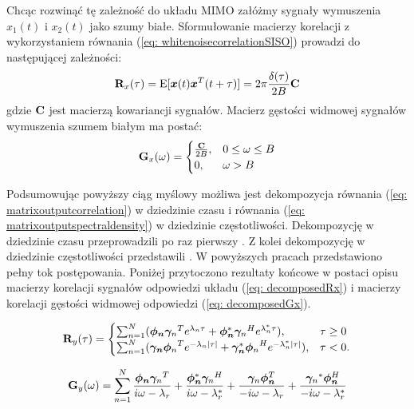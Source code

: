 Chcąc rozwinąć tę zależność do układu MIMO załóżmy sygnały wymuszenia $x_1(t)$ i $x_2(t)$ jako szumy białe. Sformułowanie macierzy korelacji z wykorzystaniem równania (\ref{eq: whitenoisecorrelationSISO}) prowadzi do następującej zależności:
\begin{equation} \label{eq: whitenoisecorrelationMIMO}
	\mathbf{R}_x(\tau)=\mathrm{E}[\bm{x}(t)\bm{x}^T(t+\tau)]=2\pi \frac{\delta(\tau)}{2B}\mathbf{C}
\end{equation} 
gdzie $\mathbf{C}$ jest macierzą kowariancji sygnałów. Macierz gęstości widmowej sygnałów wymuszenia szumem białym ma postać:
\begin{equation} \label{eq: spectraldensitymatrixWHITENOISE}
	\mathbf{G}_x(\omega)=\begin{cases}
		\frac{\mathbf{C}}{2B}, & 0\le\omega\le B\\
		0, & \omega>B
	\end{cases}
\end{equation} 


Podsumowując powyższy ciąg myślowy możliwa jest dekompozycja równania (\ref{eq: matrixoutputcorrelation}) w dziedzinie czasu i równania (\ref{eq: matrixoutputspectraldensity}) w dziedzinie częstotliwości. Dekompozycję w dziedzinie czasu przeprowadzili po raz pierwszy \cite{James1993,James1995}. Z kolei dekompozycję w dziedzinie częstotliwości przedstawili \cite{Brincker2000,Brincker2001a}. W powyższych pracach przedstawiono pełny tok postępowania. Poniżej przytoczono rezultaty końcowe w postaci opisu macierzy korelacji sygnałów odpowiedzi układu (\ref{eq: decomposedRx}) i macierzy korelacji gęstości widmowej odpowiedzi (\ref{eq: decomposedGx}).

\begin{equation} \label{eq: decomposedRx}
	\mathbf{R}_y(\tau)=\begin{cases}
		\sum_{n=1}^{N} (\bm{\phi_n}{\bm{\gamma}_n}^Te^{\lambda_n \tau} + \bm{\phi_n}^*{\bm{\gamma}_n}^He^{\lambda_n^* \tau}), & \tau\ge 0\\
		\sum_{n=1}^{N} (\bm{\gamma_n}{\bm{\phi}_n}^Te^{-\lambda_n |\tau|} + \bm{\gamma_n}^*{\bm{\phi}_n}^He^{-\lambda_n^* |\tau|}), & \tau< 0.
	\end{cases}
\end{equation} 

\begin{equation} \label{eq: decomposedGx}
	\mathbf{G}_y(\omega)=\sum_{n=1}^{N}\frac{\bm{\phi_n}{\bm{\gamma}_n}^T}{i\omega-\lambda_r}+\frac{\bm{\phi_n}^*{\bm{\gamma}_n}^H}{i\omega-\lambda_r^*}+\frac{{\bm{\gamma}_n}\bm{\phi_n}^T}{-i\omega-\lambda_r}+\frac{{\bm{\gamma}_n}^*\bm{\phi_n}^H}{-i\omega-\lambda_r^*}
\end{equation} 


